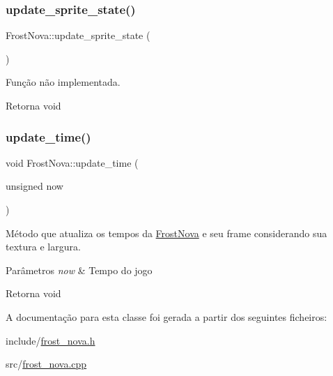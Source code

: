 \subsubsection{\texorpdfstring{update\+\_\+sprite\+\_\+state()}{update\_sprite\_state()}}
{\footnotesize\ttfamily Frost\+Nova\+::update\+\_\+sprite\+\_\+state (\begin{DoxyParamCaption}{ }\end{DoxyParamCaption})\hspace{0.3cm}{\ttfamily [protected]}}



Função não implementada. 

\begin{DoxyReturn}{Retorna}
void 
\end{DoxyReturn}
\mbox{\label{classFrostNova_ab70b5520c6db428c77aef44fe8e85570}} 
\subsubsection{\texorpdfstring{update\+\_\+time()}{update\_time()}}
{\footnotesize\ttfamily void Frost\+Nova\+::update\+\_\+time (\begin{DoxyParamCaption}\item[{unsigned}]{now }\end{DoxyParamCaption})\hspace{0.3cm}{\ttfamily [protected]}}



Método que atualiza os tempos da \mbox{\hyperlink{classFrostNova}{Frost\+Nova}} e seu frame considerando sua textura e largura. 


\begin{DoxyParams}{Parâmetros}
{\em now} & Tempo do jogo \\
\hline
\end{DoxyParams}
\begin{DoxyReturn}{Retorna}
void 
\end{DoxyReturn}


A documentação para esta classe foi gerada a partir dos seguintes ficheiros\+:\begin{DoxyCompactItemize}
\item 
include/\mbox{\hyperlink{frost__nova_8h}{frost\+\_\+nova.\+h}}\item 
src/\mbox{\hyperlink{frost__nova_8cpp}{frost\+\_\+nova.\+cpp}}\end{DoxyCompactItemize}
